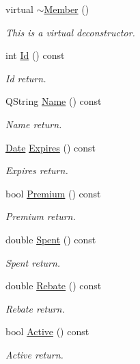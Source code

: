 \begin{DoxyCompactItemize}
virtual \hyperlink{class_member_a9e993260f63c73a91f1cb9b55fcef903}{$\sim$\+Member} ()
\begin{DoxyCompactList}\small\item\em This is a virtual deconstructor. \end{DoxyCompactList}\item 
int \hyperlink{class_member_ade792a4814b246281de4fe2a5017e5d6}{Id} () const 
\begin{DoxyCompactList}\small\item\em Id return. \end{DoxyCompactList}\item 
Q\+String \hyperlink{class_member_a5bac99875876ae00c127d47aa69370ff}{Name} () const 
\begin{DoxyCompactList}\small\item\em Name return. \end{DoxyCompactList}\item 
\hyperlink{class_date}{Date} \hyperlink{class_member_a38d327ef94499ef08c51b8a4791d6974}{Expires} () const 
\begin{DoxyCompactList}\small\item\em Expires return. \end{DoxyCompactList}\item 
bool \hyperlink{class_member_acc79ba154fd76148d5c34c3df7f0f1bf}{Premium} () const 
\begin{DoxyCompactList}\small\item\em Premium return. \end{DoxyCompactList}\item 
double \hyperlink{class_member_aa34e695e052dbdaf47f39388d524b9ee}{Spent} () const 
\begin{DoxyCompactList}\small\item\em Spent return. \end{DoxyCompactList}\item 
double \hyperlink{class_member_ab6a428e16603847fb696a9a5c90f9143}{Rebate} () const 
\begin{DoxyCompactList}\small\item\em Rebate return. \end{DoxyCompactList}\item 
bool \hyperlink{class_member_ab51d2e131d03ed0120648cce975b77d1}{Active} () const 
\begin{DoxyCompactList}\small\item\em Active return. \end{DoxyCompactList}\item 

\end{DoxyCompactItemize}
